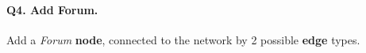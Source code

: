 \paragraph{\textbf{Q4}. Add Forum.}
Add a \emph{Forum} \textbf{node}, connected to the network by 2 possible
\textbf{edge} types.

